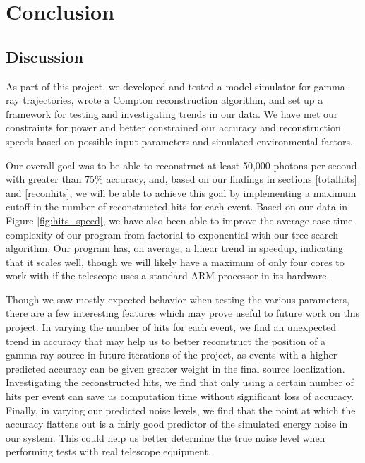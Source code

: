 \chapter{Conclusion}

\section{Discussion}
As part of this project, we developed and tested a model simulator for gamma-ray trajectories, wrote a Compton reconstruction algorithm, and set up a framework for testing and investigating trends in our data. We have met our constraints for power and better constrained our accuracy and reconstruction speeds based on possible input parameters and simulated environmental factors.

Our overall goal was to be able to reconstruct at least 50,000 photons per second with greater than 75\% accuracy, and, based on our findings in sections \ref{totalhits} and \ref{reconhits}, we will be able to achieve this goal by implementing a maximum cutoff in the number of reconstructed hits for each event. Based on our data in Figure \ref{fig:hits_speed}, we have also been able to improve the average-case time complexity of our program from factorial to exponential with our tree search algorithm. Our program has, on average, a linear trend in speedup, indicating that it scales well, though we will likely have a maximum of only four cores to work with if the telescope uses a standard ARM processor in its hardware.

Though we saw mostly expected behavior when testing the various parameters, there are a few interesting features which may prove useful to future work on this project. In varying the number of hits for each event, we find an unexpected trend in accuracy that may help us to better reconstruct the position of a gamma-ray source in future iterations of the project, as events with a higher predicted accuracy can be given greater weight in the final source localization. Investigating the reconstructed hits, we find that only using a certain number of hits per event can save us computation time without significant loss of accuracy. Finally, in varying our predicted noise levels, we find that the point at which the accuracy flattens out is a fairly good predictor of the simulated energy noise in our system. This could help us better determine the true noise level when performing tests with real telescope equipment.

